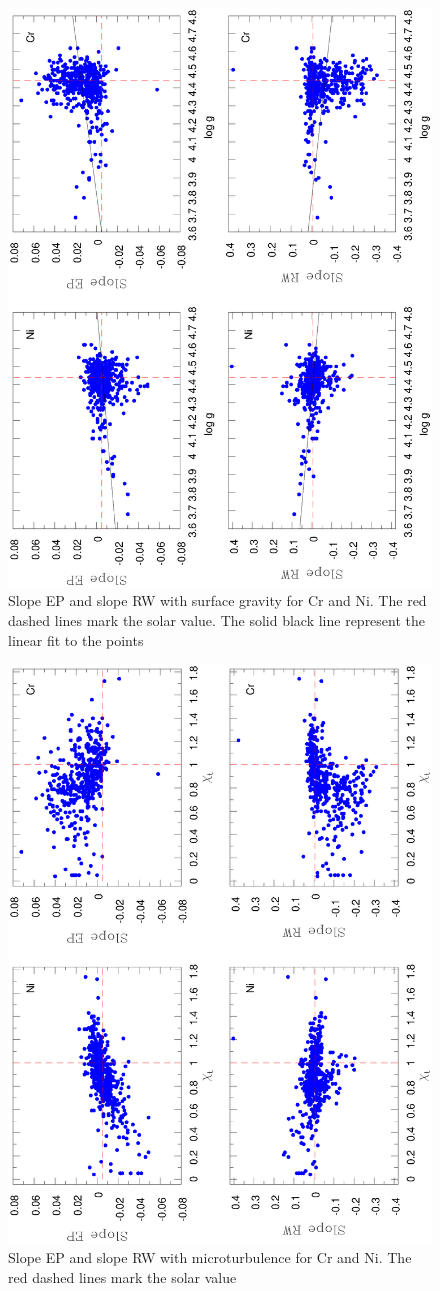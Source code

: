 \documentclass[dvips,12pt,a4paper]{report}
\begin{document}
{{\begin{figure}[h]
\centering
\includegraphics[width=10 cm, angle=-90]{pics/uncertain/logg.eps}
\caption[Slope EP and slope RW with logg for Cr and Ni]{Slope EP and slope RW with surface gravity for Cr and Ni. The red dashed lines mark the solar value. The solid black line represent the linear fit to the points }
\label{slopelogg}
\end{figure}

\begin{figure}[h]
\centering
\includegraphics[width=10 cm, angle=-90]{pics/uncertain/vtur.eps}
\caption[Slope EP and slope RW with vtur for Cr and Ni]{Slope EP and slope RW with microturbulence for Cr and Ni. The red dashed lines mark the solar value}
\label{slopevtur}
\end{figure}

}}
\end{document}
